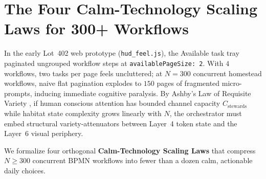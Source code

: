 \section{The Four Calm-Technology Scaling Laws for 300+ Workflows}
\label{sec:four-calm-scaling-laws}

In the early Lot~402 web prototype (\texttt{hud\_feel.js}), the Available task tray paginated ungrouped workflow steps at \texttt{availablePageSize: 2}. With $4$ workflows, two tasks per page feels uncluttered; at $N = 300$ concurrent homestead workflows, naive flat pagination explodes to $150$ pages of fragmented micro-prompts, inducing immediate cognitive paralysis. By Ashby's Law of Requisite Variety \parencite{ashby1956}, if human conscious attention has bounded channel capacity $C_{\text{stewards}}$ while habitat state complexity grows linearly with $N$, the orchestrator must embed structural variety-attenuators between Layer~4 token state and the Layer~6 visual periphery.

We formalize four orthogonal \textbf{Calm-Technology Scaling Laws} that compress $N \ge 300$ concurrent BPMN workflows into fewer than a dozen calm, actionable daily choices.


